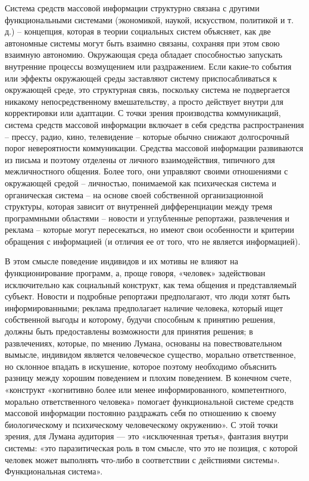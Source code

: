 \documentclass[a4page]{article}
\begin{document}
Система средств массовой информации структурно связана с другими функциональными системами (экономикой, наукой, искусством, политикой и т. д.) – концепция, которая в теории социальных систем объясняет, как две автономные системы могут быть взаимно связаны, сохраняя при этом свою взаимную автономию. Окружающая среда обладает способностью запускать внутренние процессы возмущением или раздражением. Если какие-то события или эффекты окружающей среды заставляют систему приспосабливаться к окружающей среде, это структурная связь, поскольку система не подвергается никакому непосредственному вмешательству, а просто действует внутри для корректировки или адаптации. С точки зрения производства коммуникаций, система средств массовой информации включает в себя средства распространения – прессу, радио, кино, телевидение – которые обычно снижают долгосрочный порог невероятности коммуникации. Средства массовой информации развиваются из письма и поэтому отделены от личного взаимодействия, типичного для межличностного общения. Более того, они управляют своими отношениями с окружающей средой – личностью, понимаемой как психическая система и органическая система – на основе своей собственной организационной структуры, которая зависит от внутренней дифференциации между тремя программными областями – новости и углубленные репортажи, развлечения и реклама – которые могут пересекаться, но имеют свои особенности и критерии обращения с информацией (и отличия ее от того, что не является информацией).

В этом смысле поведение индивидов и их мотивы не влияют на функционирование программ, а, проще говоря, «человек» задействован исключительно как социальный конструкт, как тема общения и представляемый субъект. Новости и подробные репортажи предполагают, что люди хотят быть информированными; реклама предполагает наличие человека, который ищет собственной выгоды и которому, будучи способным к принятию решения, должны быть предоставлены возможности для принятия решения; в развлечениях, которые, по мнению Лумана, основаны на повествовательном вымысле, индивидом является человеческое существо, морально ответственное, но склонное впадать в искушение, которое поэтому необходимо объяснить разницу между хорошим поведением и плохим поведением. В конечном счете, «конструкт «когнитивно более или менее информированного, компетентного, морально ответственного человека» помогает функциональной системе средств массовой информации постоянно раздражать себя по отношению к своему биологическому и психическому человеческому окружению»\cite{reality_of_mass_media}. С этой точки зрения, для Лумана аудитория — это «исключенная третья», фантазия внутри системы: «это паразитическая роль в том смысле, что это не позиция, с которой человек может выполнять что-либо в соответствии с действиями системы». Функциональная система».
\end{document}
